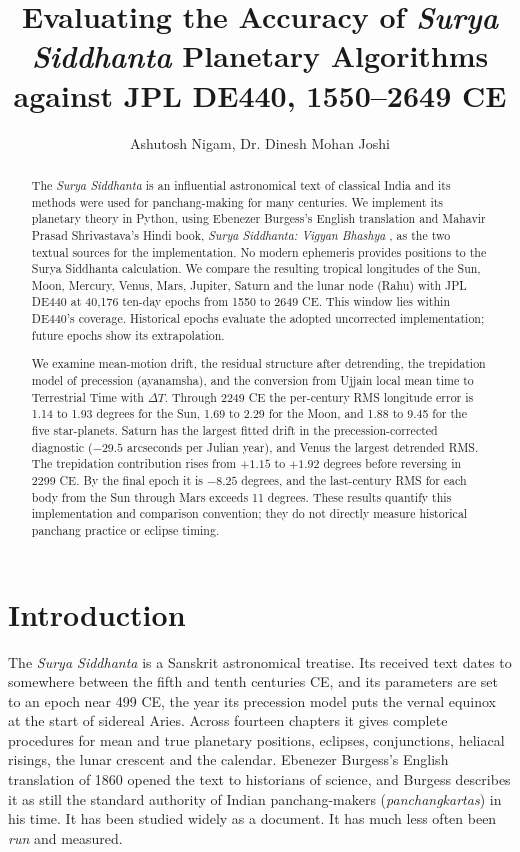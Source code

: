 \documentclass[11pt,a4paper]{article}
\title{Evaluating the Accuracy of \textit{Surya Siddhanta} Planetary Algorithms against JPL DE440, 1550--2649 CE}
\author{Ashutosh Nigam,  Dr. Dinesh Mohan Joshi}
\date{}
\newcommand{\SuSi}{\textit{Surya Siddhanta}}
\newcommand{\dT}{$\Delta T$}
\begin{document}
\maketitle

\begin{abstract}
The \SuSi{} is an influential astronomical text of classical India and its methods were used for panchang-making for many centuries. We implement its planetary theory in Python, using Ebenezer Burgess's English translation \citep{burgess1860} and Mahavir Prasad Shrivastava's Hindi book, \textit{Surya Siddhanta: Vigyan Bhashya} \citep{shrivastava}, as the two textual sources for the implementation. No modern ephemeris provides positions to the Surya Siddhanta calculation. We compare the resulting tropical longitudes of the Sun, Moon, Mercury, Venus, Mars, Jupiter, Saturn and the lunar node (Rahu) with JPL DE440 at 40,176 ten-day epochs from 1550 to 2649 CE. This window lies within DE440's coverage. Historical epochs evaluate the adopted uncorrected implementation; future epochs show its extrapolation.

We examine mean-motion drift, the residual structure after detrending, the trepidation model of precession (ayanamsha), and the conversion from Ujjain local mean time to Terrestrial Time with \dT{}. Through 2249 CE the per-century RMS longitude error is 1.14 to 1.93 degrees for the Sun, 1.69 to 2.29 for the Moon, and 1.88 to 9.45 for the five star-planets. Saturn has the largest fitted drift in the precession-corrected diagnostic ($-29.5$ arcseconds per Julian year), and Venus the largest detrended RMS. The trepidation contribution rises from $+1.15$ to $+1.92$ degrees before reversing in 2299 CE. By the final epoch it is $-8.25$ degrees, and the last-century RMS for each body from the Sun through Mars exceeds 11 degrees. These results quantify this implementation and comparison convention; they do not directly measure historical panchang practice or eclipse timing.
\end{abstract}

\section{Introduction}

The \SuSi{} is a Sanskrit astronomical treatise. Its received text dates to somewhere between the fifth and tenth centuries CE, and its parameters are set to an epoch near 499 CE, the year its precession model puts the vernal equinox at the start of sidereal Aries. Across fourteen chapters it gives complete procedures for mean and true planetary positions, eclipses, conjunctions, heliacal risings, the lunar crescent and the calendar. Ebenezer Burgess's English translation of 1860 opened the text to historians of science, and Burgess describes it as still the standard authority of Indian panchang-makers (\textit{panchangkartas}) in his time. It has been studied widely as a document. It has much less often been \emph{run} and measured.
\end{document}

